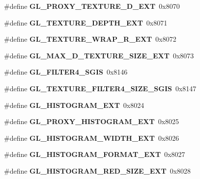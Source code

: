 \begin{DoxyCompactItemize}
\item 
\#define {\bfseries G\+L\+\_\+\+P\+R\+O\+X\+Y\+\_\+\+T\+E\+X\+T\+U\+R\+E\+\_\+D\+\_\+\+E\+X\+T}~0x8070\label{_s_d_l__opengl_8h_a847d994af0d03bca0e188b96fcc3c4d6}

\item 
\#define {\bfseries G\+L\+\_\+\+T\+E\+X\+T\+U\+R\+E\+\_\+\+D\+E\+P\+T\+H\+\_\+\+E\+X\+T}~0x8071\label{_s_d_l__opengl_8h_a83ab5a881500431d94cef3bb7dfc91a8}

\item 
\#define {\bfseries G\+L\+\_\+\+T\+E\+X\+T\+U\+R\+E\+\_\+\+W\+R\+A\+P\+\_\+\+R\+\_\+\+E\+X\+T}~0x8072\label{_s_d_l__opengl_8h_a2356893451a14a5ee1f3c32d121b2d4b}

\item 
\#define {\bfseries G\+L\+\_\+\+M\+A\+X\+\_\+D\+\_\+\+T\+E\+X\+T\+U\+R\+E\+\_\+\+S\+I\+Z\+E\+\_\+\+E\+X\+T}~0x8073\label{_s_d_l__opengl_8h_a006a505ad519db19385366c3fbb12ca5}

\item 
\#define {\bfseries G\+L\+\_\+\+F\+I\+L\+T\+E\+R4\+\_\+\+S\+G\+I\+S}~0x8146\label{_s_d_l__opengl_8h_a0a973d46343de1cc76263e2f0042036d}

\item 
\#define {\bfseries G\+L\+\_\+\+T\+E\+X\+T\+U\+R\+E\+\_\+\+F\+I\+L\+T\+E\+R4\+\_\+\+S\+I\+Z\+E\+\_\+\+S\+G\+I\+S}~0x8147\label{_s_d_l__opengl_8h_a80dc2866f7b626a60f17ade9f4f2e44a}

\item 
\#define {\bfseries G\+L\+\_\+\+H\+I\+S\+T\+O\+G\+R\+A\+M\+\_\+\+E\+X\+T}~0x8024\label{_s_d_l__opengl_8h_a1d7f8b82ac499635ec6b9144790c15bf}

\item 
\#define {\bfseries G\+L\+\_\+\+P\+R\+O\+X\+Y\+\_\+\+H\+I\+S\+T\+O\+G\+R\+A\+M\+\_\+\+E\+X\+T}~0x8025\label{_s_d_l__opengl_8h_aa00e4c2b8bf59bdbab7ac5fdc0befc98}

\item 
\#define {\bfseries G\+L\+\_\+\+H\+I\+S\+T\+O\+G\+R\+A\+M\+\_\+\+W\+I\+D\+T\+H\+\_\+\+E\+X\+T}~0x8026\label{_s_d_l__opengl_8h_a0b71930eda36bfa995c8e8a40961328f}

\item 
\#define {\bfseries G\+L\+\_\+\+H\+I\+S\+T\+O\+G\+R\+A\+M\+\_\+\+F\+O\+R\+M\+A\+T\+\_\+\+E\+X\+T}~0x8027\label{_s_d_l__opengl_8h_a50f06c060e84e5a756a8459493a9c507}

\item 
\#define {\bfseries G\+L\+\_\+\+H\+I\+S\+T\+O\+G\+R\+A\+M\+\_\+\+R\+E\+D\+\_\+\+S\+I\+Z\+E\+\_\+\+E\+X\+T}~0x8028\label{_s_d_l__opengl_8h_a93a562e74a135cc915d6c77ad9133818}


\end{DoxyCompactItemize}
